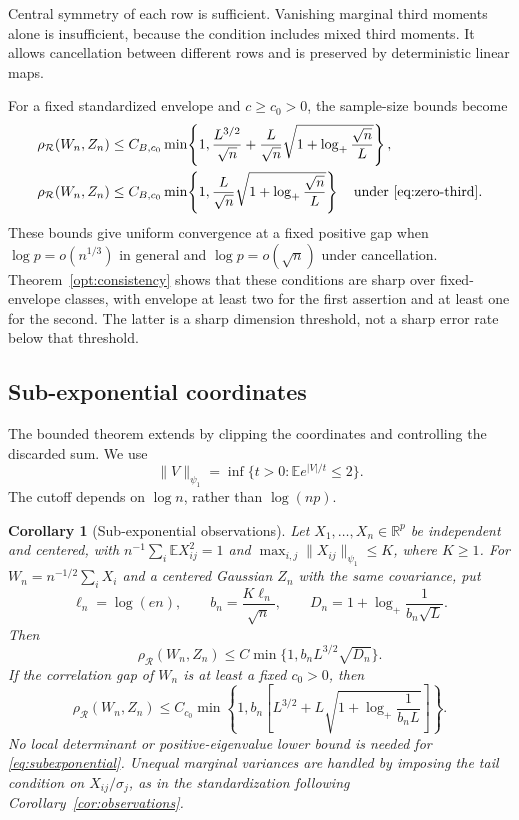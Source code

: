 \documentclass[11pt,letterpaper]{article}
\newtheorem{corollary}{Corollary}
\theoremstyle{remark}
\newcommand{\E}{\mathbb E}
\newcommand{\R}{\mathbb R}
\newcommand{\rh}{\rho_{\mathcal R}}
\begin{document}
Central symmetry of each row is sufficient. Vanishing marginal third
moments alone is insufficient, because the condition includes mixed
third moments. It allows cancellation between different rows and is
preserved by deterministic linear maps.

For a fixed standardized envelope and \(c\ge c_0>0\), the sample-size
bounds become
\begin{align}
 \rh(W_n,Z_n)&\le C_{B,c_0}\min\!\left\{1,
 \frac{L^{3/2}}{\sqrt n}
 +\frac L{\sqrt n}\sqrt{1+\log_+\frac{\sqrt n}{L}}\right\},
 \label{eq:observations-fixed}\\
 \rh(W_n,Z_n)&\le C_{B,c_0}\min\!\left\{1,
 \frac L{\sqrt n}\sqrt{1+\log_+\frac{\sqrt n}{L}}\right\}
 \quad\text{under~\eqref{eq:zero-third}}.
 \label{eq:zero-fixed}
\end{align}
These bounds give uniform convergence at a fixed positive gap when
\(\log p=o(n^{1/3})\) in general and \(\log p=o(\sqrt n)\)
under cancellation. Theorem~\ref{opt:consistency} shows that these
conditions are sharp over fixed-envelope classes, with envelope at least
two for the first assertion and at least one for the second. The latter is a sharp dimension threshold, not a sharp error
rate below that threshold.

\subsection{Sub-exponential coordinates}\label{sec:subexponential}
The bounded theorem extends by clipping the coordinates and controlling
the discarded sum. We use
\[
 \|V\|_{\psi_1}=\inf\{t>0:\E e^{|V|/t}\le2\}.
\]
The cutoff depends on \(\log n\), rather than \(\log(np)\).

\begin{corollary}[Sub-exponential observations]\label{cor:subexponential}
Let \(X_1,\ldots,X_n\in\R^p\) be independent and centered, with
\(n^{-1}\sum_i\E X_{ij}^2=1\) and
\(\max_{i,j}\|X_{ij}\|_{\psi_1}\le K\), where \(K\ge1\).
For \(W_n=n^{-1/2}\sum_iX_i\) and a centered Gaussian \(Z_n\)
with the same covariance, put
\[
 \ell_n=\log(en),\qquad b_n=\frac{K\ell_n}{\sqrt n},\qquad
 D_n=1+\log_+\frac1{b_n\sqrt L}.
\]
Then
\begin{equation}
 \rh(W_n,Z_n)\le C\min\{1,b_nL^{3/2}\sqrt{D_n}\}.
 \label{eq:subexponential}
\end{equation}
If the correlation gap of \(W_n\) is at least a fixed \(c_0>0\), then
\begin{equation}
 \rh(W_n,Z_n)\le C_{c_0}\min\!\left\{1,
 b_n\left[L^{3/2}+L\sqrt{1+\log_+\frac1{b_nL}}\right]\right\}.
 \label{eq:subexponential-gap}
\end{equation}
No local determinant or positive-eigenvalue lower bound is needed for
\eqref{eq:subexponential}. Unequal marginal variances are handled by
imposing the tail condition on \(X_{ij}/\sigma_j\), as in the
standardization following Corollary~\ref{cor:observations}.
\end{corollary}
\end{document}
